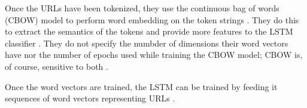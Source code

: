 Once the URLs have been tokenized, they use the continuous bag of words (CBOW) model to perform word embedding on the token strings \cite{fang2018deepxss}. They do this to extract the semantics of the tokens and provide more features to the LSTM classifier \cite{fang2018deepxss}. They do not specify the numbder of dimensions their word vectors have nor the number of epochs used while training the CBOW model; CBOW is, of course, sensitive to both \cite{mikolov2013efficient}.

Once the word vectors are trained, the LSTM can be trained by feeding it sequences of word vectors representing URLs \cite{fang2018deepxss}. 